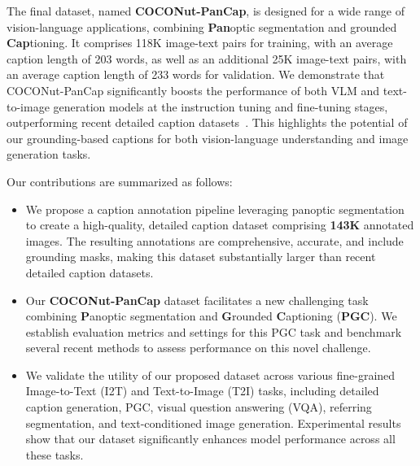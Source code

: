 The final dataset, named \textbf{COCONut-PanCap}, is designed for a wide range of vision-language applications, combining \textbf{Pan}optic segmentation and grounded \textbf{Cap}tioning. It comprises 118K image-text pairs for training, with an average caption length of 203 words, as well as an additional 25K image-text pairs, with an average caption length of 233 words for validation. We demonstrate that COCONut-PanCap significantly boosts the performance of both VLM and text-to-image generation models at the instruction tuning and fine-tuning stages, outperforming recent detailed caption datasets~\cite{Onoe2024docci}. This highlights the potential of our grounding-based captions for both vision-language understanding and image generation tasks.


Our contributions are summarized as follows: 

\begin{itemize}
    \item We propose a caption annotation pipeline leveraging panoptic segmentation to create a high-quality, detailed caption dataset comprising \textbf{143K} annotated images. The resulting annotations are comprehensive, accurate, and include grounding masks, making this dataset substantially larger than recent detailed caption datasets.
   
    \item Our \textbf{COCONut-PanCap} dataset facilitates a new challenging task combining \textbf{P}anoptic segmentation and \textbf{G}rounded \textbf{C}aptioning (\textbf{PGC}). We establish evaluation metrics and settings for this PGC task and benchmark several recent methods to assess performance on this novel challenge. 
    \item We validate the utility of our proposed dataset across various fine-grained Image-to-Text (I2T) and Text-to-Image (T2I) tasks, including detailed caption generation, PGC, visual question answering (VQA), referring segmentation, and text-conditioned image generation. Experimental results show that our dataset significantly enhances model performance across all these tasks.
\end{itemize}







